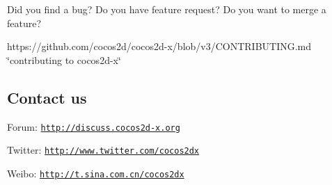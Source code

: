 Did you find a bug? Do you have feature request? Do you want to merge a feature?


\begin{DoxyItemize}
\item https\+://github.com/cocos2d/cocos2d-\/x/blob/v3/\+C\+O\+N\+T\+R\+I\+B\+U\+T\+I\+N\+G.\+md \char`\"{}contributing to cocos2d-\/x\char`\"{}
\end{DoxyItemize}

\subsection*{Contact us }


\begin{DoxyItemize}
\item Forum\+: \href{http://discuss.cocos2d-x.org}{\tt http\+://discuss.\+cocos2d-\/x.\+org}
\item Twitter\+: \href{http://www.twitter.com/cocos2dx}{\tt http\+://www.\+twitter.\+com/cocos2dx}
\item Weibo\+: \href{http://t.sina.com.cn/cocos2dx}{\tt http\+://t.\+sina.\+com.\+cn/cocos2dx} 
\end{DoxyItemize}